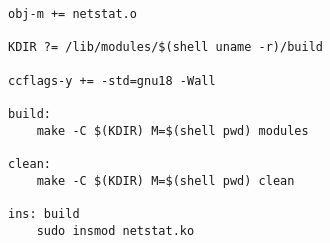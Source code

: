 \begin{center}
	\captionsetup{justification=raggedright,singlelinecheck=off}
	\begin{lstlisting}[label=lst:make,caption=Makefiel для компиляции и загрузки модуля,showstringspaces=false]
obj-m += netstat.o

KDIR ?= /lib/modules/$(shell uname -r)/build

ccflags-y += -std=gnu18 -Wall

build:
	make -C $(KDIR) M=$(shell pwd) modules

clean:
	make -C $(KDIR) M=$(shell pwd) clean

ins: build
	sudo insmod netstat.ko
	\end{lstlisting}
\end{center}
\FloatBarrier
